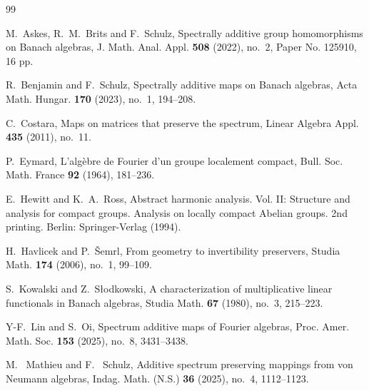 \documentclass[10pt]{amsart}
\begin{document}
\begin{thebibliography}{99}

 M.~Askes, R.~M.~Brits and F.~Schulz, Spectrally additive group homomorphisms on Banach algebras, J. Math. Anal. Appl. {\bf 508} (2022), no.~2, Paper No. 125910, 16 pp.

 R.~Benjamin and F.~Schulz, Spectrally additive maps on Banach algebras, Acta Math. Hungar. {\bf 170} (2023), no.~1, 194--208.

C.~Costara, Maps on matrices that preserve the spectrum, Linear Algebra Appl. {\bf 435} (2011), no.~11.


 P.~Eymard, L'alg\`ebre de Fourier d'un groupe localement compact, Bull. Soc. Math. France {\bf 92} (1964), 181--236.

E.~Hewitt and K.~A.~Ross, Abstract harmonic analysis. Vol. II: Structure and analysis for compact groups. Analysis on locally compact Abelian groups. 2nd printing. Berlin: Springer-Verlag (1994).

H.~Havlicek and P.~\v Semrl, From geometry to invertibility preservers, Studia Math. {\bf 174} (2006), no.~1, 99--109.


S.~Kowalski and Z.~S\l odkowski, A characterization of multiplicative linear functionals in Banach algebras, Studia Math. {\bf 67} (1980), no.~3, 215--223.

 Y-F.~Lin and S.~Oi, Spectrum additive maps of Fourier algebras, Proc. Amer. Math. Soc. {\bf 153} (2025), no.~8, 3431--3438.

 M. ~Mathieu and F. ~Schulz, Additive spectrum preserving mappings from von Neumann algebras, Indag. Math. (N.S.) {\bf 36} (2025), no.~4, 1112--1123.


\end{thebibliography}
\end{document}
